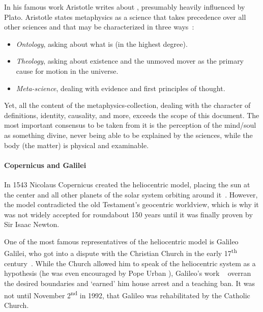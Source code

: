 In his famous work  Aristotle writes about , presumably heavily influenced by Plato.
Aristotle states metaphysics as a science that takes precedence over all other sciences and that may be characterized in three ways~\cite{aristotle350}:
\begin{itemize}
    \item \emph{Ontology}, asking about what  is (in the highest degree).
    \item \emph{Theology}, asking about existence and the unmoved mover as the primary cause for motion in the universe.
    \item \emph{Meta-science}, dealing with evidence and first principles of thought.
\end{itemize}
Yet, all the content of the metaphysics-collection, dealing with the character of definitions, identity, causality, and more, exceeds the scope of this document.
The most important consensus to be taken from it is the perception of the \mbox{mind/soul} as something divine, never being able to be explained by the sciences,
while the body (the matter) is physical and examinable.


\paragraph{Copernicus and Galilei} In 1543 Nicolaus Copernicus created the heliocentric model, placing the sun at the center and all other planets of the solar system orbiting around it~\cite{copernicus1965revolutionibus}.
However, the model contradicted the old Testament's geocentric worldview, which is why it was not widely accepted for roundabout 150 years until it was finally proven by Sir Isaac Newton.

One of the most famous representatives of the heliocentric model is Galileo Galilei, who got into a dispute with the Christian Church in the early 17\textsuperscript{th} century~\cite{folsing1983galileo}.
While the Church allowed him to speak of the heliocentric system as a hypothesis (he was even encouraged by Pope Urban ), Galileo's work ~\cite{galilei1632dialogo} overran the desired boundaries and \enquote*{earned} him house arrest and a teaching ban.
It was not until November 2\textsuperscript{nd} in 1992, that Galileo was rehabilitated by the Catholic Church.

